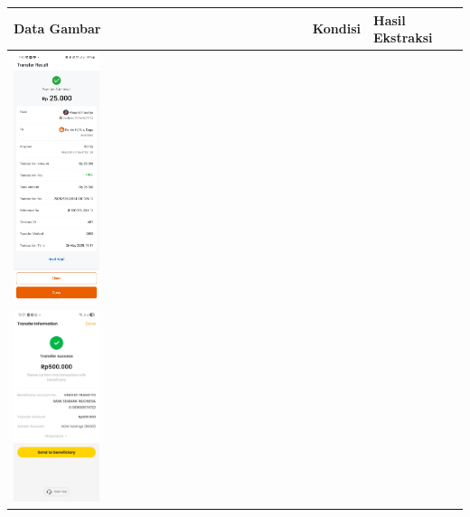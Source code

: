 \begin{table}[htbp]
    \centering
    \begin{tabularx}{\textwidth}{|p{4.2cm}|X|X|}
        \hline
        \textbf{Data Gambar} & \textbf{Kondisi} & \textbf{Hasil Ekstraksi}\\ \hline
        \includegraphics[width=0.3\textwidth]{images/contoh-data/tf-3.jpg} & 
         & 
         \\ \hline
        \includegraphics[width=0.3\textwidth]{images/contoh-data/tf-4.jpg} & 
         & 
         \\ \hline
    \end{tabularx}
\end{table}


